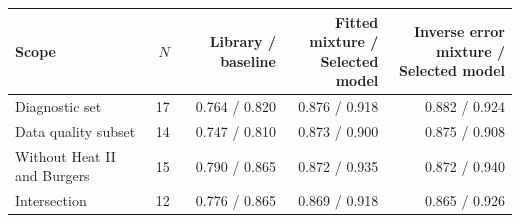 \begin{tabular}{lrrrr}
\toprule
Scope & $N$ & Library / baseline & \shortstack[r]{Fitted mixture /\\Selected model} & \shortstack[r]{Inverse error mixture /\\Selected model} \\
\midrule
Diagnostic set & 17 & 0.764 / 0.820 & 0.876 / 0.918 & 0.882 / 0.924 \\
Data quality subset & 14 & 0.747 / 0.810 & 0.873 / 0.900 & 0.875 / 0.908 \\
Without Heat II and Burgers & 15 & 0.790 / 0.865 & 0.872 / 0.935 & 0.872 / 0.940 \\
Intersection & 12 & 0.776 / 0.865 & 0.869 / 0.918 & 0.865 / 0.926 \\
\bottomrule
\end{tabular}
